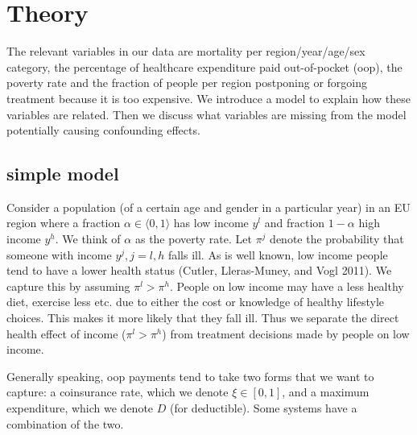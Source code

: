 \documentclass[a4paper,12pt]{article}
\makeatletter
\newcommand{\citeprocitem}[2]{\hyper@linkstart{cite}{citeproc_bib_item_#1}#2\hyper@linkend}
\makeatother
\begin{document}
\section{Theory}
\label{sec:orga08abbf}

The relevant variables in our data are mortality per region/year/age/sex category, the percentage of healthcare expenditure paid out-of-pocket (oop), the poverty rate and the fraction of people per region postponing or forgoing treatment because it is too expensive. We introduce a model to explain how these variables are related. Then we discuss what variables are missing from the model potentially causing confounding effects.

\subsection{simple model}
\label{sec:org67de43c}

Consider a population (of a certain age and gender in a particular year) in an EU region where a fraction \(\alpha \in \langle 0,1 \rangle\) has low income \(y^l\) and fraction \(1-\alpha\) high income \(y^h\). We think of \(\alpha\) as the poverty rate. Let \(\pi^j\) denote the probability that someone with income \(y^j, j=l,h\) falls ill. As is well known, low income people tend to have a lower health status (\citeprocitem{9}{Cutler, Lleras-Muney, and Vogl 2011}). We capture this by assuming \(\pi^l > \pi^h\). People on low income may have a less healthy diet, exercise less etc. due to either the cost or knowledge of healthy lifestyle choices. This makes it more likely that they fall ill. Thus we separate the direct health effect of income (\(\pi^l > \pi^h\)) from treatment decisions made by people on low income.

Generally speaking, oop payments tend to take two forms that we want to capture: a coinsurance rate, which we denote \(\xi \in [0,1]\), and a maximum expenditure, which we denote \(D\) (for deductible). Some systems have a combination of the two.
\end{document}
